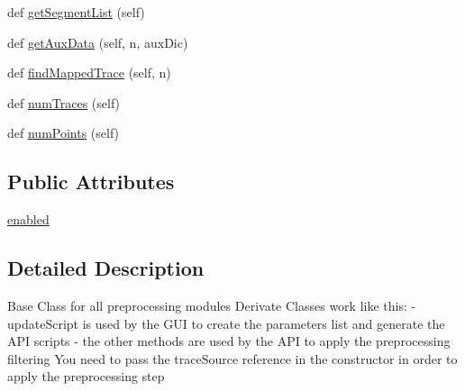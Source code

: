 \begin{DoxyCompactItemize}
\item 
def \hyperlink{classsoftware_1_1chipwhisperer_1_1analyzer_1_1preprocessing_1_1__base_1_1PreprocessingBase_ad0fe8b21c542e0851e5c10ca8128a4fb}{get\+Segment\+List} (self)
\item 
def \hyperlink{classsoftware_1_1chipwhisperer_1_1analyzer_1_1preprocessing_1_1__base_1_1PreprocessingBase_a42050903e153b279344fd344547b6832}{get\+Aux\+Data} (self, n, aux\+Dic)
\item 
def \hyperlink{classsoftware_1_1chipwhisperer_1_1analyzer_1_1preprocessing_1_1__base_1_1PreprocessingBase_aabc8dbcfac138ca7e9cb3781aea30189}{find\+Mapped\+Trace} (self, n)
\item 
def \hyperlink{classsoftware_1_1chipwhisperer_1_1analyzer_1_1preprocessing_1_1__base_1_1PreprocessingBase_a8a5570de2dcd1bfa2f7094af292d8397}{num\+Traces} (self)
\item 
def \hyperlink{classsoftware_1_1chipwhisperer_1_1analyzer_1_1preprocessing_1_1__base_1_1PreprocessingBase_aa88129028d0bcdb18323d3eef3d95d6d}{num\+Points} (self)
\end{DoxyCompactItemize}
\subsection*{Public Attributes}
\begin{DoxyCompactItemize}
\item 
\hyperlink{classsoftware_1_1chipwhisperer_1_1analyzer_1_1preprocessing_1_1__base_1_1PreprocessingBase_ae665d04fcffe5a72f76fb88c4e0f9aaa}{enabled}
\end{DoxyCompactItemize}


\subsection{Detailed Description}
\begin{DoxyVerb}Base Class for all preprocessing modules
Derivate Classes work like this:
    - updateScript is used by the GUI to create the parameters list and generate the API scripts
    - the other methods are used by the API to apply the preprocessing filtering
      You need to pass the traceSource reference in the constructor in order to apply the preprocessing step
\end{DoxyVerb}
 

